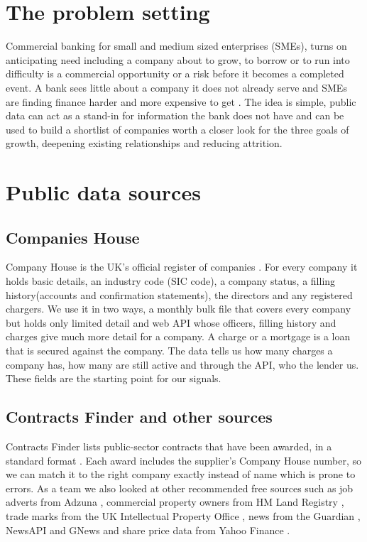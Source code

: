 \documentclass[ %
                    author={Daniel Page},
                supervisor={Dr. Andrew Calway},
                    degree={MSc},
                     title={Some Structural Guidelines for Data Science MSc Theses, Including Those With Long Titles that Run Across Multiple Lines on the Front Page},
                  subtitle={And those including an optional subtitle too, for good measure},
                      type={},
                      year={2021}]{dissertation}
\begin{document}
\section{The problem setting}
Commercial banking for small and medium sized enterprises (SMEs), turns on anticipating need including a company about to grow, to borrow or to run into difficulty is a commercial opportunity or a risk before it becomes a completed event. A bank sees little about a company it does not already serve and SMEs are finding finance harder and more expensive to get \cite{bbb_2024,oecd_2024_sme}. The idea is simple, public data can act as a stand-in for information the bank does not have and can be used to build a shortlist of companies worth a closer look for the three goals of growth, deepening existing relationships and reducing attrition.

\section{Public data sources}
\subsection{Companies House}
Company House is the UK's official register of companies \cite{companieshouse_api}. For every company it holds basic details, an industry code (SIC code), a company status, a filling history(accounts and confirmation statements), the directors and any registered chargers. We use it in two ways, a monthly bulk file that covers every company but holds only limited detail and web API whose officers, filling history and charges give much more detail for a company. A charge or a mortgage is a loan that is secured against the company. The data tells us how many charges a company has, how many are still active and through the API, who the lender us. These fields are the starting point for our signals.

\subsection{Contracts Finder and other sources
}
Contracts Finder \cite{contractsfinder} lists public-sector contracts that have been awarded, in a standard format \cite{ocds}. Each award includes the supplier's Company House number, so we can match it to the right company exactly instead of name which is prone to errors. As a team we also looked at other recommended free sources such as job adverts from Adzuna \cite{adzuna_api}, commercial property owners from HM Land Registry \cite{landregistry_ccod}, trade marks from the UK Intellectual Property Office \cite{ukipo_tm}, news from the Guardian \cite{guardian_api}, NewsAPI \cite{newsapi} and GNews \cite{gnews_api} and share price data from Yahoo Finance \cite{yfinance}. 
\end{document}
